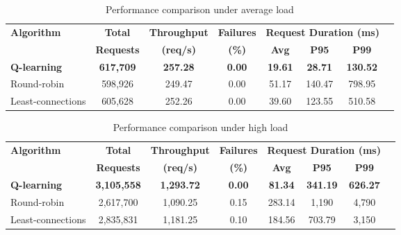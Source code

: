 \documentclass[lnbip]{svmultln}
\begin{document}
\begin{table}[htbp]
\centering
\caption{Performance comparison under average load}
\setlength{\tabcolsep}{5pt}
\begin{tabular}{lccccccc}
\toprule
\textbf{Algorithm} & \textbf{Total} & \textbf{Throughput} & \textbf{Failures} & \multicolumn{3}{c}{\textbf{Request Duration (ms)}} \\
 & \textbf{Requests} & \textbf{(req/s)} & \textbf{(\%)} & \textbf{Avg} & \textbf{P95} & \textbf{P99} \\
\midrule
\textbf{Q-learning} & \textbf{617{,}709} & \textbf{257.28} & \textbf{0.00} & \textbf{19.61} & \textbf{28.71} & \textbf{130.52} \\
Round-robin & 598{,}926 & 249.47 & 0.00 & 51.17 & 140.47 & 798.95 \\
Least-connections & 605{,}628 & 252.26 & 0.00 & 39.60 & 123.55 & 510.58 \\
\bottomrule
\end{tabular}
\label{t:ex_1}
\end{table}

\begin{table}[htbp]
\centering
\caption{Performance comparison under high load}
\setlength{\tabcolsep}{5pt}
\begin{tabular}{lccccccc}
\toprule
\textbf{Algorithm} & \textbf{Total} & \textbf{Throughput} & \textbf{Failures} & \multicolumn{3}{c}{\textbf{Request Duration (ms)}} \\
 & \textbf{Requests} & \textbf{(req/s)} & \textbf{(\%)} & \textbf{Avg} & \textbf{P95} & \textbf{P99} \\
\midrule
\textbf{Q-learning} & \textbf{3{,}105{,}558} & \textbf{1{,}293.72} & \textbf{0.00} & \textbf{81.34} & \textbf{341.19} & \textbf{626.27} \\
Round-robin & 2{,}617{,}700 & 1{,}090.25 & 0.15 & 283.14 & 1{,}190 & 4{,}790 \\
Least-connections & 2{,}835{,}831 & 1{,}181.25 & 0.10 & 184.56 & 703.79 & 3{,}150 \\
\bottomrule
\end{tabular}
\label{t:ex_2}
\end{table}
\end{document}
